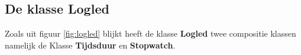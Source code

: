 

\subsection{De klasse Logled}

Zoals uit figuur \ref{fig:logled} blijkt heeft de klasse \textbf{Logled} twee compositie klassen namelijk de Klasse \textbf{Tijdsduur} en \textbf{Stopwatch}.

